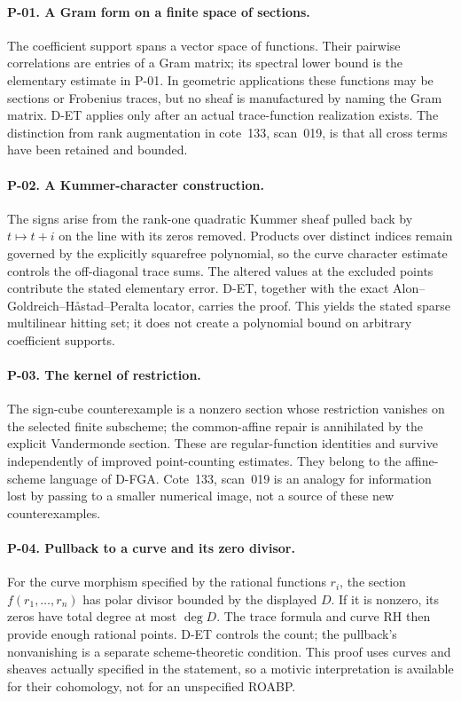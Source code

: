 \documentclass[11pt,a4paper]{article}
\theoremstyle{definition}\newtheorem{definition}{Definition}
\begin{document}
\paragraph{P-01. A Gram form on a finite space of sections.}
The coefficient support spans a vector space of functions. Their pairwise correlations are entries of a Gram matrix; its spectral lower bound is the elementary estimate in P-01. In geometric applications these functions may be sections or Frobenius traces, but no sheaf is manufactured by naming the Gram matrix. D-ET applies only after an actual trace-function realization exists. The distinction from rank augmentation in cote~133, scan~019, is that all cross terms have been retained and bounded.

\paragraph{P-02. A Kummer-character construction.}
The signs arise from the rank-one quadratic Kummer sheaf pulled back by $t\mapsto t+i$ on the line with its zeros removed. Products over distinct indices remain governed by the explicitly squarefree polynomial, so the curve character estimate controls the off-diagonal trace sums. The altered values at the excluded points contribute the stated elementary error. D-ET, together with the exact Alon--Goldreich--H\aa stad--Peralta locator, carries the proof. This yields the stated sparse multilinear hitting set; it does not create a polynomial bound on arbitrary coefficient supports.

\paragraph{P-03. The kernel of restriction.}
The sign-cube counterexample is a nonzero section whose restriction vanishes on the selected finite subscheme; the common-affine repair is annihilated by the explicit Vandermonde section. These are regular-function identities and survive independently of improved point-counting estimates. They belong to the affine-scheme language of D-FGA. Cote~133, scan~019 is an analogy for information lost by passing to a smaller numerical image, not a source of these new counterexamples.

\paragraph{P-04. Pullback to a curve and its zero divisor.}
For the curve morphism specified by the rational functions $r_i$, the section $f(r_1,\ldots,r_n)$ has polar divisor bounded by the displayed $D$. If it is nonzero, its zeros have total degree at most $\deg D$. The trace formula and curve RH then provide enough rational points. D-ET controls the count; the pullback's nonvanishing is a separate scheme-theoretic condition. This proof uses curves and sheaves actually specified in the statement, so a motivic interpretation is available for their cohomology, not for an unspecified ROABP.
\end{document}
